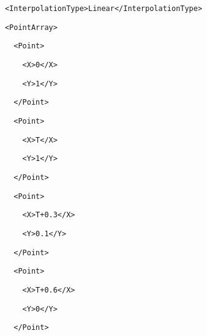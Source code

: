 \documentclass[a4paper,english,american]{book}
\begin{document}
{\begin{spacing}{0.8}
{}
\par
\texttt{\footnotesize ~~~~~~<InterpolationType>Linear</InterpolationType>}{\footnotesize\par
}
\par
\texttt{\footnotesize ~~~~~~<PointArray>}{\footnotesize\par
}
\par
\texttt{\footnotesize ~~~~~~~~<Point>}{\footnotesize\par
}
\par
\texttt{\footnotesize ~~~~~~~~~~<X>0</X>}{\footnotesize\par
}
\par
\texttt{\footnotesize ~~~~~~~~~~<Y>1</Y>}{\footnotesize\par
}
\par
\texttt{\footnotesize ~~~~~~~~</Point>}{\footnotesize\par
}
\par
\texttt{\footnotesize ~~~~~~~~<Point>}{\footnotesize\par
}
\par
\texttt{\footnotesize ~~~~~~~~~~<X>T</X>}{\footnotesize\par
}
\par
\texttt{\footnotesize ~~~~~~~~~~<Y>1</Y>}{\footnotesize\par
}
\par
\texttt{\footnotesize ~~~~~~~~</Point>}{\footnotesize\par
}
\par
\texttt{\footnotesize ~~~~~~~~<Point>}{\footnotesize\par
}
\par
\texttt{\footnotesize ~~~~~~~~~~<X>T+0.3</X>}{\footnotesize\par
}
\par
\texttt{\footnotesize ~~~~~~~~~~<Y>0.1</Y>}{\footnotesize\par
}
\par
\texttt{\footnotesize ~~~~~~~~</Point>}{\footnotesize\par
}
\par
\texttt{\footnotesize ~~~~~~~~<Point>}{\footnotesize\par
}
\par
\texttt{\footnotesize ~~~~~~~~~~<X>T+0.6</X>}{\footnotesize\par
}
\par
\texttt{\footnotesize ~~~~~~~~~~<Y>0</Y>}{\footnotesize\par
}
\par
\texttt{\footnotesize ~~~~~~~~</Point>}{\footnotesize\par
}
\end{spacing}}
\end{document}
